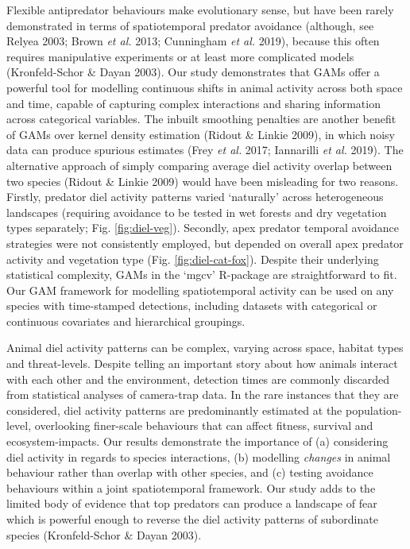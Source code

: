 \documentclass[]{elsarticle} %
\begin{document}
Flexible antipredator behaviours make evolutionary sense, but have been rarely demonstrated in terms of spatiotemporal predator avoidance (although, see Relyea 2003; Brown \emph{et al.} 2013; Cunningham \emph{et al.} 2019), because this often requires manipulative experiments or at least more complicated models (Kronfeld-Schor \& Dayan 2003). Our study demonstrates that GAMs offer a powerful tool for modelling continuous shifts in animal activity across both space and time, capable of capturing complex interactions and sharing information across categorical variables. The inbuilt smoothing penalties are another benefit of GAMs over kernel density estimation (Ridout \& Linkie 2009), in which noisy data can produce spurious estimates (Frey \emph{et al.} 2017; Iannarilli \emph{et al.} 2019). The alternative approach of simply comparing average diel activity overlap between two species (Ridout \& Linkie 2009) would have been misleading for two reasons. Firstly, predator diel activity patterns varied `naturally' across heterogeneous landscapes (requiring avoidance to be tested in wet forests and dry vegetation types separately; Fig. \ref{fig:diel-veg}). Secondly, apex predator temporal avoidance strategies were not consistently employed, but depended on overall apex predator activity and vegetation type (Fig. \ref{fig:diel-cat-fox}). Despite their underlying statistical complexity, GAMs in the `mgcv' R-package are straightforward to fit. Our GAM framework for modelling spatiotemporal activity can be used on any species with time-stamped detections, including datasets with categorical or continuous covariates and hierarchical groupings.

Animal diel activity patterns can be complex, varying across space, habitat types and threat-levels. Despite telling an important story about how animals interact with each other and the environment, detection times are commonly discarded from statistical analyses of camera-trap data. In the rare instances that they are considered, diel activity patterns are predominantly estimated at the population-level, overlooking finer-scale behaviours that can affect fitness, survival and ecosystem-impacts. Our results demonstrate the importance of (a) considering diel activity in regards to species interactions, (b) modelling \emph{changes} in animal behaviour rather than overlap with other species, and (c) testing avoidance behaviours within a joint spatiotemporal framework. Our study adds to the limited body of evidence that top predators can produce a landscape of fear which is powerful enough to reverse the diel activity patterns of subordinate species (Kronfeld-Schor \& Dayan 2003).
\end{document}
